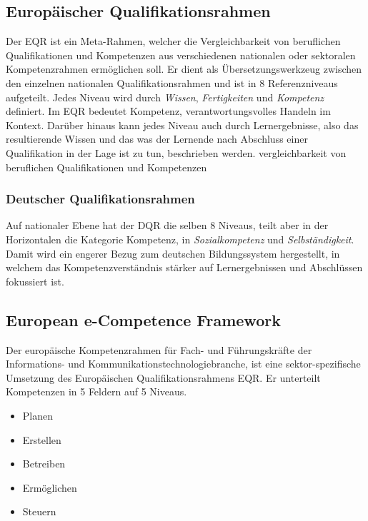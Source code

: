 \vspace{1em}
\subsection{Europäischer Qualifikationsrahmen}
Der EQR ist ein Meta-Rahmen, welcher die Vergleichbarkeit von beruflichen Qualifikationen und Kompetenzen aus verschiedenen nationalen oder sektoralen Kompetenzrahmen ermöglichen soll. Er dient als Übersetzungswerkzeug zwischen den einzelnen nationalen  Qualifikationsrahmen und ist in 8 Referenzniveaus aufgeteilt. Jedes Niveau wird durch  \textit{Wissen}, \textit{Fertigkeiten} und \textit{Kompetenz} definiert. Im EQR bedeutet Kompetenz, verantwortungsvolles Handeln im Kontext. Darüber hinaus kann jedes Niveau auch durch Lernergebnisse, also das resultierende Wissen und das was der Lernende nach Abschluss einer Qualifikation in der Lage ist zu tun, beschrieben werden. 
vergleichbarkeit von beruflichen Qualifikationen und Kompetenzen

\subsubsection{Deutscher Qualifikationsrahmen}

Auf nationaler Ebene hat der DQR die selben 8 Niveaus, teilt aber in der Horizontalen die  Kategorie Kompetenz, in \textit{Sozialkompetenz} und \textit{Selbständigkeit}. Damit wird ein engerer Bezug zum deutschen Bildungssystem hergestellt, in welchem das Kompetenzverständnis  stärker auf Lernergebnissen und Abschlüssen fokussiert ist.
\subsection{European e-Competence Framework}\label{e-CF}

Der europäische Kompetenzrahmen für Fach- und Führungskräfte der Informations- und Kommunikationstechnologiebranche, ist eine sektor-spezifische Umsetzung des Europäischen Qualifikationsrahmens EQR. Er unterteilt Kompetenzen in 5 Feldern auf 5 Niveaus. 
\vspace{1em}
\begin{itemize}
	\item Planen
	\item Erstellen
	\item Betreiben
	\item Ermöglichen
	\item Steuern
\end{itemize}

